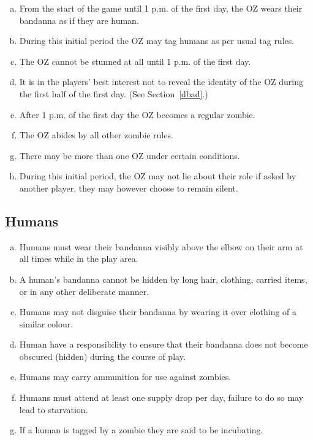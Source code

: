 \documentclass[a4paper,12pt]{article}
\begin{document}
\begin{enumerate}[(a)]
    \item From the start of the game until 1 p.m. of the first day, the OZ wears their bandanna as if they are human. 
    \item During this initial period the OZ may tag humans as per usual tag rules.
    \item The OZ cannot be stunned at all until 1 p.m. of the first day.
    \item It is in the players' best interest not to reveal the identity of the OZ during the first half of the first day. (See Section~\ref{dbad}.)
    \item After 1 p.m. of the first day the OZ becomes a regular zombie.
    \item The OZ abides by all other zombie rules.
    \item There may be more than one OZ under certain conditions.
    \item During this initial period, the OZ may not lie about their role if asked by another player, they may however choose to remain silent. 
\end{enumerate}

\subsection{Humans}

\begin{enumerate}[(a)]
    \item Humans must wear their bandanna visibly above the elbow on their arm at all times while in the play area.
    \item A human's bandanna cannot be hidden by long hair, clothing, carried items, or in any other deliberate manner.
    \item Humans may not disguise their bandanna by wearing it over clothing of a similar colour.
    \item Human have a responsibility to ensure that their bandanna does not become obscured (hidden) during the course of play.
    \item Humans may carry ammunition for use against zombies.
    \item Humans must attend at least one supply drop per day, failure to do so may lead to starvation.
    \item If a human is tagged by a zombie they are said to be incubating.
\end{enumerate}
\end{document}

